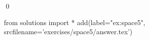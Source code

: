 
\begin{ex} 
  \label{ex:space5}
  
  \qed
\end{ex} 
\begin{python0}
from solutions import *
add(label="ex:space5",
    srcfilename='exercises/space5/answer.tex') 
\end{python0}
